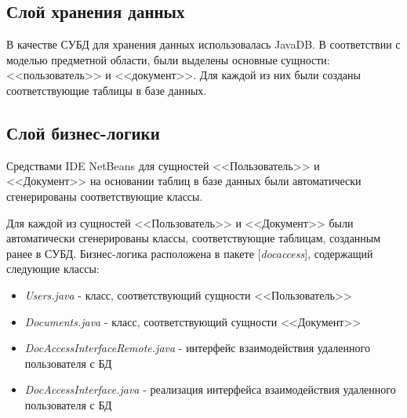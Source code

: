\subsection{Слой хранения данных}
В качестве СУБД для хранения данных использовалась JavaDB. В соответствии с моделью предметной области, были выделены основные сущности: <<пользователь>> и <<документ>>. Для каждой из них были созданы соответствующие таблицы в базе данных.

\subsection{Слой бизнес-логики}
Средствами IDE NetBeans для сущностей <<Пользователь>> и <<Документ>> на основании таблиц в базе данных были автоматически сгенерированы соответствующие классы.

Для каждой из сущностей <<Пользователь>> и <<Документ>> были автоматически сгенерированы классы, соответствующие таблицам, созданным ранее в СУБД. Бизнес-логика расположена в пакете [\textit{docaccess}], содержащий следующие классы:
\begin{itemize}
	\item \textit{Users.java} - класс, соответствующий сущности <<Пользователь>>
	\item \textit{Documents.java} - класс, соответствующий сущности <<Документ>>
	\item \textit{DocAccessInterfaceRemote.java} - интерфейс взаимодействия удаленного пользователя с БД
	\item \textit{DocAccessInterface.java} - реализация интерфейса взаимодействия удаленного пользователя с БД
	
\end{itemize}